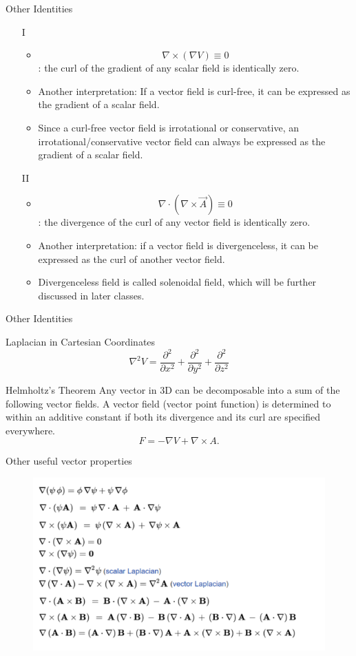 \documentclass[xcolor={dvipsnames}]{beamer}
\begin{document}
\begin{frame}{Other Identities}
\begin{itemize}
    \item[I]
    \begin{itemize}
        \item $$\nabla\times(\nabla V) \equiv 0$$: the curl of the gradient of any scalar field is identically zero.
        \item Another interpretation: If a vector field is curl-free, it can be expressed as the gradient of a scalar field.
        \item Since a curl-free vector field is irrotational or conservative, an irrotational/conservative vector field can always be expressed as the gradient of a scalar field.
    \end{itemize} 
    \item[II]\begin{itemize}
        \item $$\nabla\cdot(\nabla\times\vec{A})\equiv0$$: the divergence of the curl of any vector field is identically zero.
        \item Another interpretation: if a vector field is divergenceless, it can be expressed as the curl of another vector field.
        \item Divergenceless field is called solenoidal field, which will be further discussed in later classes.
    \end{itemize}
\end{itemize}
\end{frame}
\begin{frame}{Other Identities}
\begin{block}{Laplacian in Cartesian Coordinates}
$$\nabla^2 V = \frac{\partial^2 }{\partial x^2}+\frac{\partial^2 }{\partial y^2}+\frac{\partial^2 }{\partial z^2}$$
\end{block}
\pause
\begin{block}{Helmholtz's Theorem}
Any vector in 3D can be decomposable into a sum of the following vector fields. A vector field (vector point function) is determined to within an additive constant if both its divergence and its curl are specified everywhere.
$$F=-\nabla V+\nabla\times A.$$
\end{block}
\end{frame}
\begin{frame}{Other useful vector properties}
\begin{figure}[H]
	\centering
	\includegraphics[width=0.9\linewidth]{2_3.png}
\end{figure}
\end{frame}
\end{document}

